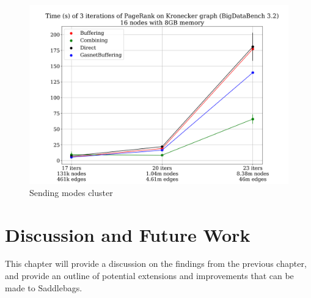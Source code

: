 \documentclass{uit-report}
\begin{document}
\begin{figure}[H]
	\centering
	\includegraphics[width=15cm]{illustrations/png/sendingmodescluster.png}
	\caption{Sending modes cluster}
	\label{fig:sendingmodesabel}
\end{figure}


\newpage
\mbox{} \pagebreak
\newpage
\chapter{Discussion and Future Work} \label{section:discussion}
This chapter will provide a discussion on the findings from the previous chapter, and provide an outline of potential extensions and improvements that can be made to Saddlebags.
\end{document}
